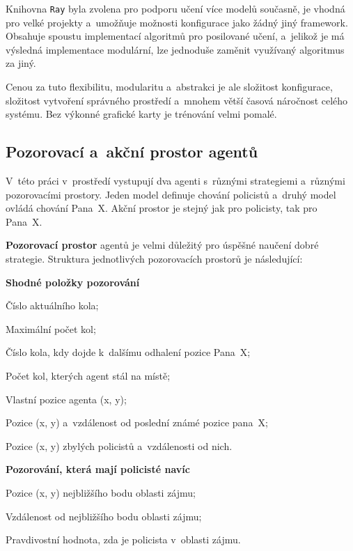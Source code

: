 Knihovna \texttt{Ray} byla zvolena pro podporu učení více modelů současně, je vhodná pro velké projekty a~umožňuje možnosti konfigurace jako žádný jiný framework.
Obsahuje spoustu implementací algoritmů pro posilované učení, a~jelikož je má výsledná implementace modulární, lze jednoduše zaměnit využívaný algoritmus za jiný.

Cenou za tuto flexibilitu, modularitu a~abstrakci je ale složitost konfigurace, složitost vytvoření správného prostředí a~mnohem větší časová náročnost celého systému.
Bez výkonné grafické karty je trénování velmi pomalé.

\subsection{Pozorovací a~akční prostor agentů}
V~této práci v~prostředí vystupují dva agenti s~různými strategiemi a~různými pozorovacími prostory.
Jeden model definuje chování policistů a~druhý model ovládá chování Pana~X\@.
Akční prostor je stejný jak pro policisty, tak pro Pana~X\@.

\bigskip
\textbf{Pozorovací prostor} agentů je velmi důležitý pro úspěšné naučení dobré strategie.
Struktura jednotlivých pozorovacích prostorů je následující:

\begin{myitemize}
  \item \textbf{Shodné položky pozorování}
  \begin{myitemize}
    \item Číslo aktuálního kola;
    \item Maximální počet kol;
    \item Číslo kola, kdy dojde k~dalšímu odhalení pozice Pana~X;
    \item Počet kol, kterých agent stál na místě;
    \item Vlastní pozice agenta (x, y);
    \item Pozice (x, y) a~vzdálenost od poslední známé pozice pana~X;
    \item Pozice (x, y) zbylých policistů a~vzdálenosti od nich.
  \end{myitemize}
  \item \textbf{Pozorování, která mají policisté navíc}
    \begin{myitemize}
    \item Pozice (x, y) nejbližšího bodu oblasti zájmu;
    \item Vzdálenost od nejbližšího bodu oblasti zájmu;
    \item Pravdivostní hodnota, zda je policista v~oblasti zájmu.
  \end{myitemize}
\end{myitemize}

